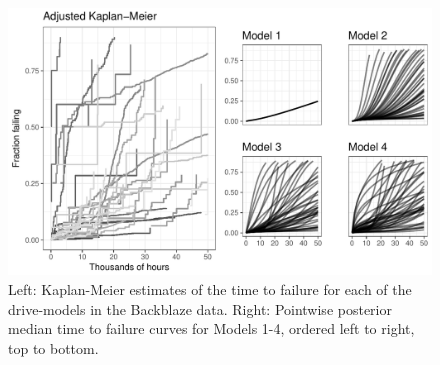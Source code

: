 \documentclass[12pt]{article}
\begin{document}
\begin{figure}[H]
\includegraphics[width=\textwidth]{heterogeneity-compare}
\caption{Left: Kaplan-Meier estimates of the time to failure for each of the drive-models in the Backblaze data. Right: Pointwise posterior median time to failure curves for Models 1-4, ordered left to right, top to bottom.}
\label{fig:fig2}
\end{figure}
\end{document}
